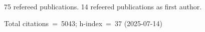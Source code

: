 75 refereed publications. 14 refeered publications as first author.

Total citations~=~5043; h-index~=~37 (2025-07-14)